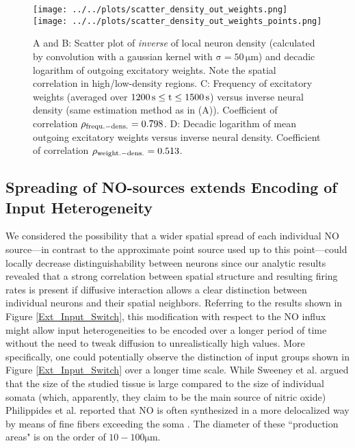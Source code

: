 \documentclass[10pt,a4paper]{article}
\begin{document}
\begin{figure}
\texttt{[image: ../../plots/scatter\_density\_out\_weights.png]}
\texttt{[image: ../../plots/scatter\_density\_out\_weights\_points.png]}
\caption{A and B: Scatter plot of \emph{inverse} of local neuron density (calculated by convolution with a gaussian kernel with $\mathrm{\sigma = 50\, \mu m}$) and decadic logarithm of outgoing excitatory weights. Note the spatial correlation in high/low-density regions. C: Frequency of excitatory weights (averaged over $\rm 1200\,s \leq t \leq 1500\,s$) versus inverse neural density (same estimation method as in (A)). Coefficient of correlation $\rho_{\rm frequ.-dens.} = 0.798$. D: Decadic logarithm of mean outgoing excitatory weights versus inverse neural density. Coefficient of correlation $\rho_{\rm weight.-dens.} = 0.513$.}
\label{Inverse_Dens_vs_Sum_Out_Weights}
\end{figure}

\newpage
\subsection{Spreading of NO-sources extends Encoding of Input Heterogeneity}\label{NO_source_spread_section}
We considered the possibility that a wider spatial spread of each individual NO source---in contrast to the approximate point source used up to this point---could locally decrease distinguishability between neurons since our analytic results revealed that a strong correlation between spatial structure and resulting firing rates is present if diffusive interaction allows a clear distinction between individual neurons and their spatial neighbors. Referring to the results shown in Figure \ref{Ext_Input_Switch}, this modification with respect to the NO influx might allow input heterogeneities to be encoded over a longer period of time without the need to tweak diffusion to unrealistically high values. More specifically, one could potentially observe the distinction of input groups shown in Figure \ref{Ext_Input_Switch} over a longer time scale.  While Sweeney et al. argued that the size of the studied tissue is large compared to the size of individual somata (which, apparently, they claim to be the main source of nitric oxide) Philippides et al. reported that NO is often synthesized in a more delocalized way by means of fine fibers exceeding the soma \cite{Philippides_2005}. The diameter of these ``production areas" is on the order of $\mathrm{10-100 \mu m}$.
\end{document}
